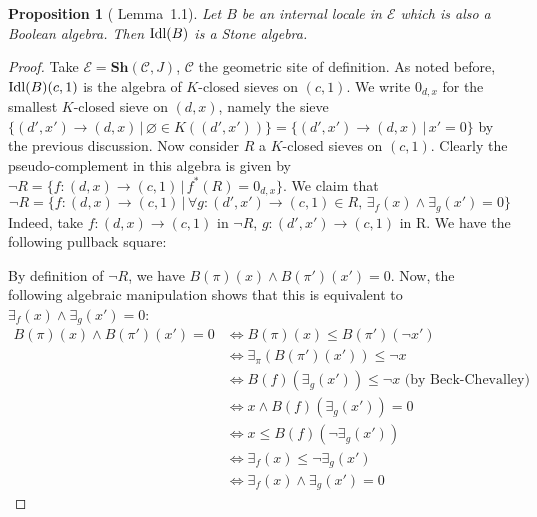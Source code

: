 \documentclass{article}
\newtheorem{proposition}[theorem]{Proposition}
\begin{document}
\begin{proposition}[\cite{johnstone1980gleason} Lemma~1.1]
    Let $B$ be an internal locale in $\mathcal{E}$ which is also a Boolean algebra. Then $\textup{Idl}(B)$ is a Stone algebra. 
\end{proposition}
\begin{proof}
    Take $\mathcal{E}=\mathbf{Sh}(\mathcal{C},J)$, $\mathcal{C}$ the geometric site of definition. As noted before, $\textup{Idl}(B)(c,1)$ is the algebra of $K$-closed sieves on $(c,1)$. We write $0_{d,x}$ for the smallest $K$-closed sieve on $(d,x)$, namely the sieve $\{(d',x')\xrightarrow{}(d,x)\,|\,\varnothing\in K((d',x'))\}=\{(d',x')\xrightarrow{}(d,x)\,|\,x'=0\}$ by the previous discussion. Now consider $R$ a $K$-closed sieves on $(c,1)$. Clearly the pseudo-complement in this algebra is given by $\neg R=\{f:(d,x)\xrightarrow{}(c,1)\,|\,f^*(R)=0_{d,x}\}$. We claim that $$\neg R = \{f:(d,x)\xrightarrow{}(c,1)\,|\,\forall g:(d',x')\xrightarrow{}(c,1)\in R,\,\exists_f(x)\land\exists_g(x')=0\}$$
    Indeed, take $f:(d,x)\xrightarrow{}(c,1)$ in $\neg R$, $g:(d',x')\xrightarrow{}(c,1)$ in R. We have the following pullback square:
\begin{center}
    \end{center}
By definition of $\neg R$, we have $B(\pi)(x)\land B(\pi')(x')=0$. Now, the following algebraic manipulation shows that this is equivalent to $\exists_f(x)\land\exists_g(x')=0$:
\begin{align*}
    B(\pi)(x)\land B(\pi')(x')=0 & \iff B(\pi)(x)\leq B(\pi')(\neg x') \\
    & \iff \exists_\pi(B(\pi')(x'))\leq\neg x\\
    & \iff B(f)(\exists_g(x'))\leq\neg x \text{    (by Beck-Chevalley)}\\
    & \iff x\land B(f)(\exists_g(x')) = 0\\
    & \iff x\leq B(f)(\neg \exists_g(x'))\\
    & \iff \exists_f(x)\leq\neg\exists_g(x')\\
    & \iff \exists_f(x)\land\exists_g(x')=0
\end{align*}


\end{proof}
\end{document}
